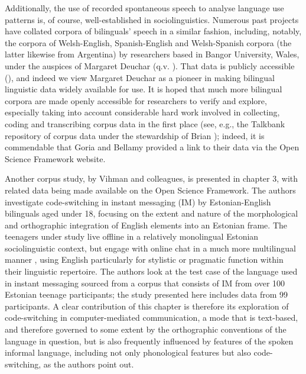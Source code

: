 \documentclass[output=paper]{langscibook}
\begin{document}
Additionally, the use of recorded spontaneous speech to analyse language use patterns is, of course, well-established in sociolinguistics. Numerous past projects have collated corpora of bilinguals’ speech in a similar fashion, including, notably, the corpora of Welsh-English, Spanish-English and Welsh-Spanish corpora (the latter likewise from Argentina) by researchers based in Bangor University, Wales, under the auspices of Margaret Deuchar (q.v. \citealt{DeucharEtAl2018}). That data is publicly accessible (\citealt{Bangortalknodate}), and indeed we view Margaret Deuchar as a pioneer in making bilingual linguistic data widely available for use. It is hoped that much more bilingual corpora are made openly accessible for researchers to verify and explore, especially taking into account considerable hard work involved in collecting, coding and transcribing corpus data in the first place (see, e.g., the Talkbank repository of corpus data under the stewardship of Brian \citealt{MacWhinney2000}); indeed, it is commendable that Goria and Bellamy provided a link to their data via the Open Science Framework website.

Another corpus study, by Vihman and colleagues, is presented in chapter 3, with related data being made available on the Open Science Framework. The authors investigate code-switching in instant messaging (IM) by Estonian-English bilinguals aged under 18, focusing on the extent and nature of the morphological and orthographic integration of English elements into an Estonian frame. The teenagers under study live offline in a relatively monolingual Estonian sociolinguistic context, but engage with online chat in a much more multilingual manner \citep{VihmanEtAl2022}, using English particularly for stylistic or pragmatic function within their linguistic repertoire. The authors look at the test case of the language used in instant messaging sourced from a corpus that consists of IM from over 100 Estonian teenage participants; the study presented here includes data from 99 participants. A clear contribution of this chapter is therefore its exploration of code-switching in computer-mediated communication, a mode that is text-based, and therefore governed to some extent by the orthographic conventions of the language in question, but is also frequently influenced by features of the spoken informal language, including not only phonological features but also code-switching, as the authors point out.
\end{document}
